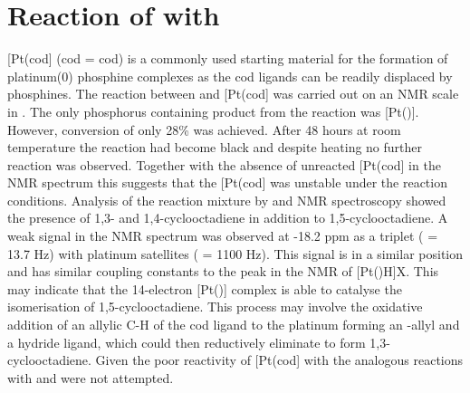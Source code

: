 
\section{Reaction of \tButhixantphos{} with \texorpdfstring{\ce{[Pt(cod)2]}} P}

[Pt(\acrshort{cod}] (\acrshort{cod} = \acrlong{cod}) is a commonly used starting material for the formation of platinum(0) phosphine complexes as the cod ligands can be readily displaced by phosphines.\cite{Green1975b, Green1977c}  The reaction between \tButhixantphos{} and [Pt(cod] was carried out on an NMR scale in .  The only phosphorus containing product from the reaction was [Pt(\tButhixantphos)].  However, conversion of only 28\% was achieved.  After 48 hours at room temperature the reaction had become black and despite heating no further reaction was observed.  Together with the absence of unreacted [Pt(cod] in the \proton{} NMR spectrum this suggests that the [Pt(cod] was unstable under the reaction conditions.  Analysis of the reaction mixture by \proton{} and \carbon{} NMR spectroscopy showed the presence of 1,3- and 1,4-cyclooctadiene in addition to 1,5-cyclooctadiene.  A weak signal in the \proton{} NMR spectrum was observed at -18.2 ppm as a triplet (\JPH{} = 13.7 Hz) with platinum satellites (\JPtH{} = 1100 Hz).  This signal is in a similar position and has similar coupling constants to the peak in the \proton{} NMR of [Pt(\tBuxantphos)H]X.  This may indicate that the 14-electron [Pt(\tButhixantphos)] complex is able to catalyse the isomerisation of 1,5-cyclooctadiene.  This process may involve the oxidative addition of an allylic C-H of the cod ligand to the platinum forming an -allyl and a hydride ligand, which could then reductively eliminate to form 1,3-cyclooctadiene.  Given the poor reactivity of [Pt(cod] with \tButhixantphos{} the analogous reactions with \tBusixantphos{} and \tBuxantphos{} were not attempted. 


